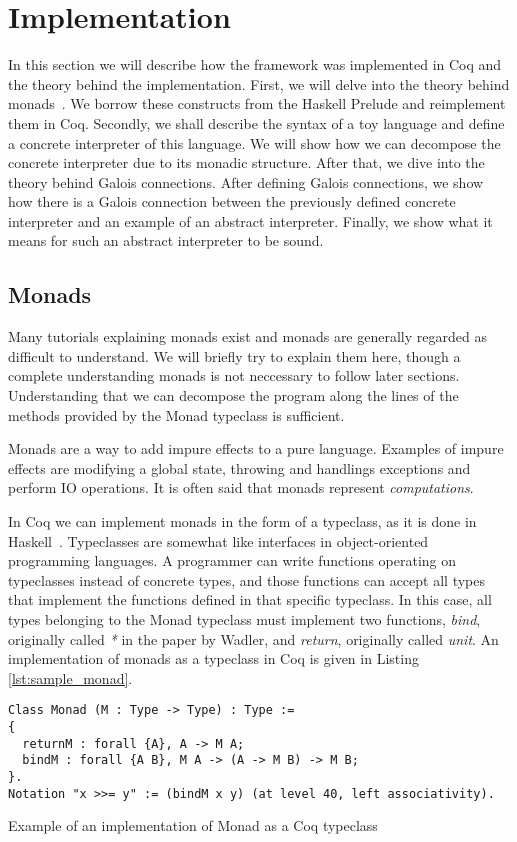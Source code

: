 \section{Implementation}
In this section we will describe how the framework was implemented in Coq and
the theory behind the implementation. First, we will delve into the theory
behind monads~\cite{wadler1995monads}. We borrow these constructs from the 
Haskell Prelude and reimplement them in Coq. Secondly, we shall describe the 
syntax of a toy language and define a concrete interpreter of this language. We
will show how we can decompose the concrete interpreter due to its monadic
structure. After that, we
dive into the theory behind Galois connections. After defining Galois
connections, we show how there is a Galois connection between the previously
defined concrete interpreter and an example of an abstract interpreter.
Finally, we show what it means for such an abstract interpreter to be sound.

\subsection{Monads}
Many tutorials explaining monads exist and monads are generally regarded as
difficult to understand. We will briefly try to explain them here, though
a complete understanding monads is not neccessary to follow later sections.
Understanding that we can decompose the program along the lines of the methods
provided by the Monad typeclass is sufficient.

Monads are a way to add impure effects to a pure language. Examples of impure
effects are modifying a global state, throwing and handlings exceptions and
perform IO operations. It is often said that monads represent
\textit{computations}. 

In Coq we can implement monads in the form of a typeclass, as it is done in
Haskell~\cite{sozeau2008first}. Typeclasses are somewhat like interfaces in 
object-oriented programming languages. A programmer can write functions 
operating on typeclasses instead of concrete types, and those functions can
accept all types that implement the functions defined in that specific typeclass. 
In this case, all types belonging to the Monad typeclass must implement two functions,
\textit{bind}, originally called \textit{*} in the paper by Wadler, and 
\textit{return}, originally called \textit{unit}. An implementation of monads
as a typeclass in Coq is given in Listing \ref{lst:sample_monad}.

\begin{listing}[H]
\begin{verbatim}
Class Monad (M : Type -> Type) : Type :=
{
  returnM : forall {A}, A -> M A;
  bindM : forall {A B}, M A -> (A -> M B) -> M B;
}.
Notation "x >>= y" := (bindM x y) (at level 40, left associativity).
\end{verbatim}
\caption{Example of an implementation of Monad as a Coq typeclass}
\label{lst:sample_monad}
\end{listing}

